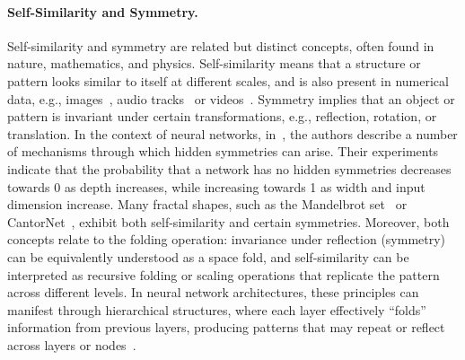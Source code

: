 \paragraph{Self-Similarity and Symmetry.} 
Self-similarity and symmetry are related but distinct concepts, often found in nature, mathematics, and physics. Self-similarity means that a structure or pattern looks similar to itself at different scales, and is also present in numerical data, e.g., images~\citep{Wang2020}, audio tracks~\citep{Foote1999} or videos~\citep{AlemanFlores2004}. Symmetry implies that an object or pattern is invariant under certain transformations, e.g., reflection, rotation, or translation. In the context of neural networks, in~\cite{grigsby23hiddensymmetries}, the authors describe a number of mechanisms through which hidden symmetries can arise. Their experiments indicate that the probability that a network has no hidden symmetries decreases towards 0 as depth increases, while increasing towards 1 as width and input dimension increase. Many fractal shapes, such as the Mandelbrot set~\citep{mandelbrot1983fractal} or CantorNet~\citep{lewandowski2024cantornet}, exhibit both self-similarity and certain symmetries.
Moreover, both concepts relate to the folding operation: invariance under reflection (symmetry) can be equivalently understood as a space fold, and self-similarity can be interpreted as recursive folding or scaling operations that replicate the pattern across different levels. In neural network architectures, these principles can manifest through hierarchical structures, where each layer effectively ``folds'' information from previous layers, producing patterns that may repeat or reflect across layers or nodes~\citep{raghu2017expressive}.



